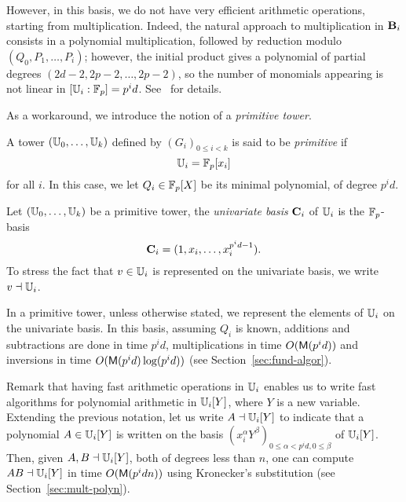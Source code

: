 However, in this basis, we do not have very efficient arithmetic
operations, starting from multiplication. Indeed, the natural approach
to multiplication in $\mathbf{B}_i$ consists in a polynomial multiplication,
followed by reduction modulo $(Q_0,P_1,\dots,P_i)$; however, the
initial product gives a polynomial of partial degrees
$(2d-2,2p-2,\dots,2p-2)$, so the number of monomials appearing is not
linear in $[\mathbb{U}_i:\mathbb{F}_p]=p^id$.  See~\cite{li+moreno+schost07} for
details.

As a workaround, we introduce the notion of a {\em primitive tower}.

\begin{definition}
  A tower $(\mathbb{U}_0,\ldots,\mathbb{U}_k)$ defined by $(G_i)_{0 \le i < k}$ is
  said to be \emph{primitive} if
  \begin{equation}
    \label{eq:59}
    \mathbb{U}_i = \mathbb{F}_p[x_i]
  \end{equation}
  for all $i$. In this case, we let $Q_i\in \mathbb{F}_p[X]$ be its minimal
  polynomial, of degree $p^id$.
\end{definition}

\begin{definition}
  Let $(\mathbb{U}_0,\ldots,\mathbb{U}_k)$ be a primitive tower, the \emph{univariate
    basis} $\mathbf{C}_i$ of $\mathbb{U}_i$ is the $\mathbb{F}_p$-basis
  \begin{equation}
    \mathbf{C}_i=(1,x_i,\dots,x_i^{p^id-1})
    \text{.}  
  \end{equation}
  To stress the fact that $v\in\mathbb{U}_i$ is represented on the univariate
  basis, we write $v\dashv\mathbb{U}_i$.
\end{definition}

In a primitive tower, unless otherwise stated, we represent the
elements of $\mathbb{U}_i$ on the univariate basis. In this basis, assuming
$Q_i$ is known, additions and subtractions are done in time $p^id$,
multiplications in time $O(\mathsf{M}(p^id))$ and inversions in time
$O(\mathsf{M}(p^id)\log(p^id))$ (see Section~\ref{sec:fund-algor}).

Remark that having fast arithmetic operations in $\mathbb{U}_i$ enables us to
write fast algorithms for polynomial arithmetic in $\mathbb{U}_i[Y]$, where
$Y$ is a new variable. Extending the previous notation, let us write
$A \dashv\mathbb{U}_i[Y]$ to indicate that a polynomial $A \in \mathbb{U}_i[Y]$ is
written on the basis $(x_i^\alpha Y^\beta)_{0 \le \alpha < p^id, 0 \le
  \beta}$ of $\mathbb{U}_i[Y]$.  Then, given $A,B \dashv \mathbb{U}_i[Y]$, both of
degrees less than $n$, one can compute $AB \dashv \mathbb{U}_i[Y]$ in time
$O(\mathsf{M}(p^id n))$ using Kronecker's substitution (see
Section~\ref{sec:mult-polyn}).

